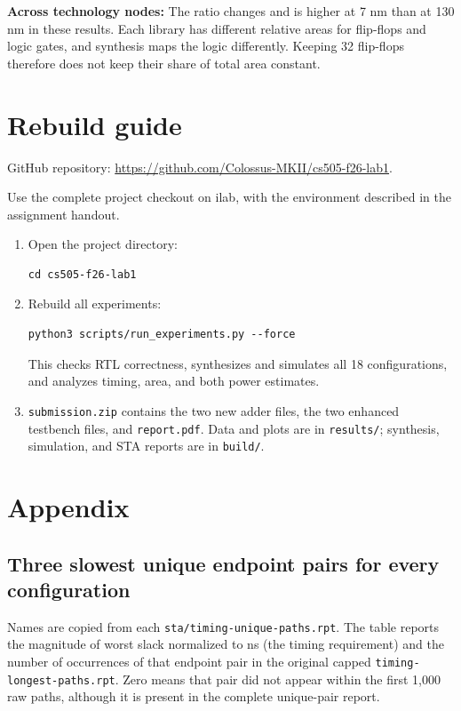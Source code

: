 \documentclass[10pt,letterpaper]{article}
\begin{document}
\textbf{Across technology nodes:} The ratio changes and is higher
at 7 nm than at 130 nm in these results. Each library has different relative
areas for flip-flops and logic gates, and synthesis maps the logic differently.
Keeping 32 flip-flops therefore does not keep their share of total area constant.

\section{Rebuild guide}
GitHub repository: \url{https://github.com/Colossus-MKII/cs505-f26-lab1}.

Use the complete project checkout on ilab, with the environment described
in the assignment handout.
\begin{enumerate}
\item Open the project directory:
\begin{Verbatim}[fontsize=\small]
cd cs505-f26-lab1
\end{Verbatim}
\item Rebuild all experiments:
\begin{Verbatim}[fontsize=\small]
python3 scripts/run_experiments.py --force
\end{Verbatim}
This checks RTL correctness, synthesizes and simulates all 18 configurations,
and analyzes timing, area, and both power estimates.
\item \texttt{submission.zip} contains the two new adder files,
the two enhanced testbench files, and \texttt{report.pdf}. Data and plots are in
\texttt{results/}; synthesis, simulation, and STA reports are in \texttt{build/}.
\end{enumerate}


\section{Appendix}
\renewcommand{\thesubsection}{\Alph{subsection}}
\subsection{Three slowest unique endpoint pairs for every configuration}
\label{app:timing-paths}
Names are copied from each \texttt{sta/timing-unique-paths.rpt}. The table
reports the magnitude of worst slack normalized to ns (the timing requirement)
and the number of occurrences of that endpoint pair in the original capped
\texttt{timing-longest-paths.rpt}. Zero means that pair did not appear within
the first 1,000 raw paths, although it is present in the complete unique-pair report.
\end{document}
